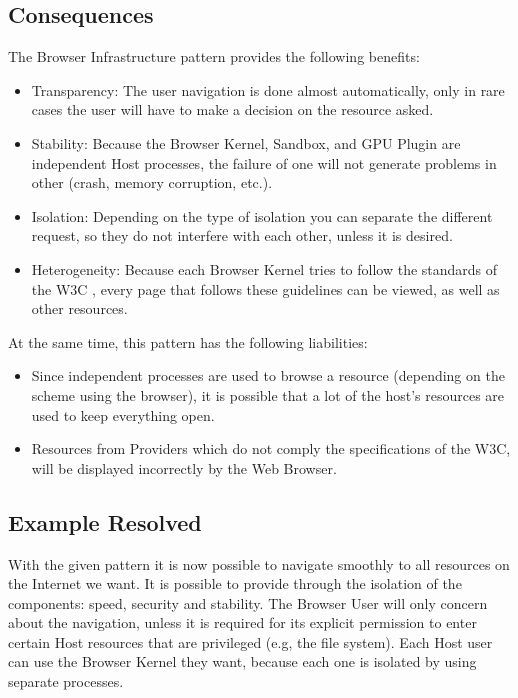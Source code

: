 \documentclass{sig-alternate-05-2015}
\begin{document}
  \subsection*{Consequences}
  The Browser Infrastructure pattern provides the following benefits:
  \begin{itemize}
    \item Transparency: The user navigation is done almost automatically, only in rare cases the user will have to make a decision on the resource asked.
    \item Stability: Because the Browser Kernel, Sandbox, and GPU  Plugin are independent Host processes, the failure of one will not generate problems in other (crash, memory corruption, etc.).
    \item Isolation: Depending on the type of isolation you can separate the different request, so they do not interfere with each other, unless it is desired.
    \item Heterogeneity: Because each Browser Kernel tries to follow the standards of the W3C \cite{w3c}, every page that follows these guidelines can be viewed, as well as other resources.
  \end{itemize}
  At the same time, this pattern has the following liabilities:
  \begin{itemize}
    \item Since independent processes are used to browse a resource (depending on the scheme using the browser), it is possible that a lot of the host's resources are used to keep everything open.
    \item Resources from Providers which do not comply the specifications of the W3C, will be displayed incorrectly by the Web Browser.
  \end{itemize}

  \subsection*{Example Resolved}
With the given pattern it is now possible to navigate smoothly to all resources on the Internet we want. It is possible to provide through the isolation of the components: speed, security and stability. The Browser User will only concern about the navigation, unless it is required for its explicit permission to enter certain Host resources that are privileged (e.g, the file system). Each Host user can use the Browser Kernel they want, because each one is isolated by using separate processes.
\end{document}
